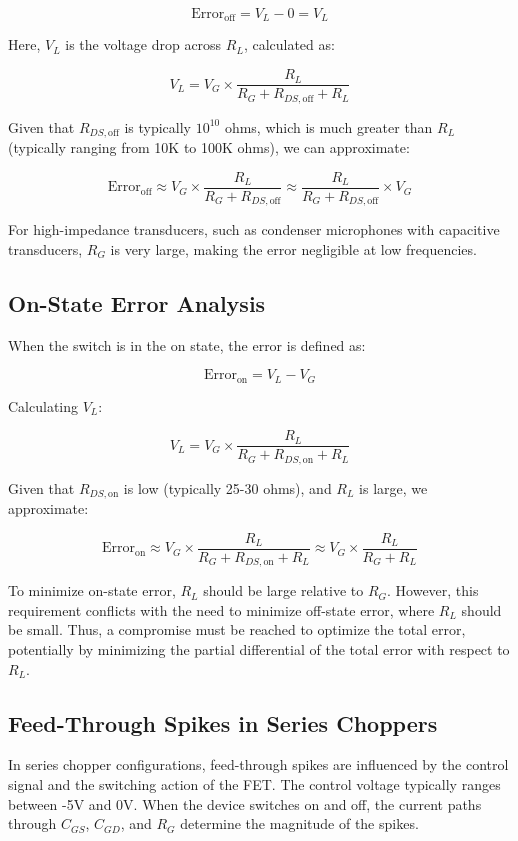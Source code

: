 \[
\text{Error}_{\text{off}} = V_L - 0 = V_L
\]

Here, \( V_L \) is the voltage drop across \( R_L \), calculated as:

\[
V_L = V_G \times \frac{R_L}{R_G + R_{DS,\text{off}} + R_L}
\]

Given that \( R_{DS,\text{off}} \) is typically \( 10^{10} \) ohms, which is much greater than \( R_L \) (typically ranging from 10K to 100K ohms), we can approximate:

\[
\text{Error}_{\text{off}} \approx V_G \times \frac{R_L}{R_G + R_{DS,\text{off}}} \approx \frac{R_L}{R_G + R_{DS,\text{off}}} \times V_G
\]

For high-impedance transducers, such as condenser microphones with capacitive transducers, \( R_G \) is very large, making the error negligible at low frequencies.

\subsection{On-State Error Analysis}

When the switch is in the on state, the error is defined as:

\[
\text{Error}_{\text{on}} = V_L - V_G
\]

Calculating \( V_L \):

\[
V_L = V_G \times \frac{R_L}{R_G + R_{DS,\text{on}} + R_L}
\]

Given that \( R_{DS,\text{on}} \) is low (typically 25-30 ohms), and \( R_L \) is large, we approximate:

\[
\text{Error}_{\text{on}} \approx V_G \times \frac{R_L}{R_G + R_{DS,\text{on}} + R_L} \approx V_G \times \frac{R_L}{R_G + R_L}
\]

To minimize on-state error, \( R_L \) should be large relative to \( R_G \). However, this requirement conflicts with the need to minimize off-state error, where \( R_L \) should be small. Thus, a compromise must be reached to optimize the total error, potentially by minimizing the partial differential of the total error with respect to \( R_L \).

\subsection{Feed-Through Spikes in Series Choppers}

In series chopper configurations, feed-through spikes are influenced by the control signal and the switching action of the FET. The control voltage typically ranges between -5V and 0V. When the device switches on and off, the current paths through \( C_{GS} \), \( C_{GD} \), and \( R_G \) determine the magnitude of the spikes.

